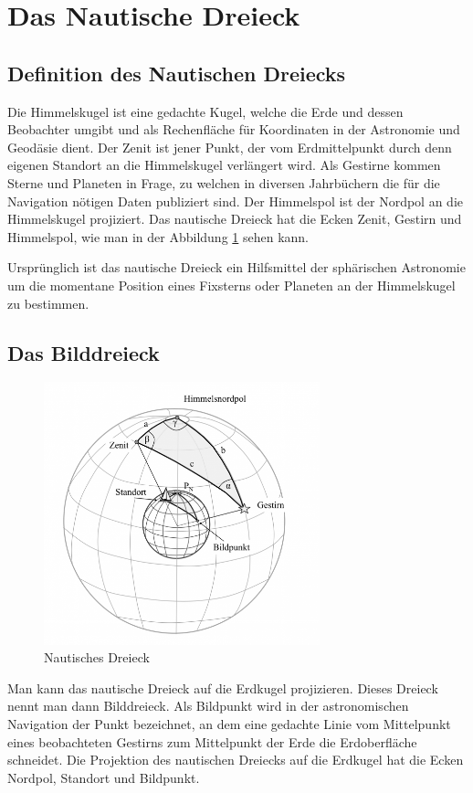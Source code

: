 \section{Das Nautische Dreieck}
\subsection{Definition des Nautischen Dreiecks}
%
Die Himmelskugel ist eine gedachte Kugel, welche die Erde und dessen Beobachter umgibt und als Rechenfläche für Koordinaten in der Astronomie und Geodäsie dient.
%
Der Zenit ist jener Punkt, der vom Erdmittelpunkt durch denn eigenen Standort an die Himmelskugel verlängert wird.
%
Als Gestirne kommen Sterne und Planeten in Frage, zu welchen in diversen Jahrbüchern die für die Navigation nötigen Daten publiziert sind.
%
Der Himmelspol ist der Nordpol an die Himmelskugel projiziert.
%
Das nautische Dreieck hat die Ecken Zenit, Gestirn und Himmelspol, wie man in der Abbildung \ref{naut} sehen kann.
%
%

Ursprünglich ist das nautische Dreieck ein Hilfsmittel der sphärischen
Astronomie um die momentane Position eines Fixsterns oder Planeten
an der Himmelskugel zu bestimmen.

\subsection{Das Bilddreieck}
\begin{figure}
\centering
		\includegraphics[width=8cm]{papers/nav/bilder/kugel3.png}
		\caption[Nautisches Dreieck]{Nautisches Dreieck}
		\label{naut}
\end{figure}
 Man kann das nautische Dreieck auf die Erdkugel projizieren.
Dieses Dreieck nennt man dann Bilddreieck.
%
Als Bildpunkt wird in der astronomischen Navigation der Punkt bezeichnet, an dem eine gedachte Linie vom Mittelpunkt eines beobachteten Gestirns zum Mittelpunkt der Erde die Erdoberfläche schneidet. 
%
Die Projektion des nautischen Dreiecks auf die Erdkugel hat die Ecken Nordpol, Standort und Bildpunkt.

